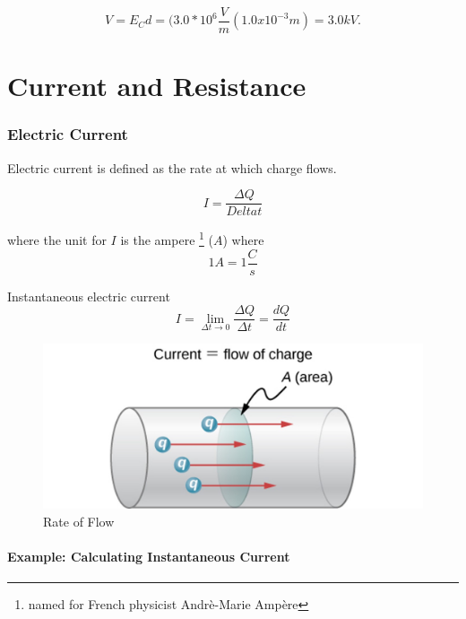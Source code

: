 \documentclass[14pt]{memoir}
\begin{document}
\begin{equation}
V = E_C d = (3.0 * 10^6 \frac{V}{m}(1.0 x 10^{-3}m) = 3.0 kV.
\end{equation}

\chapter{Current and Resistance}

\subsection{Electric Current}

Electric current is defined as the rate at which charge flows.

\begin{equation}
I = \frac{\Delta Q}{Delta t}
\end{equation}

where the unit for $I$ is the ampere \footnote{named for French physicist Andr\`e-Marie Amp\`ere} ($A$) where 
\begin{equation}
1 A = 1 \frac{C}{s}
\end{equation}

Instantaneous electric current
\begin{equation}
I = \lim_{\Delta t \rightarrow 0} \frac{\Delta Q}{\Delta t} = \frac{dQ}{dt}
\end{equation}


\begin{figure}[H]
\begin{center}
\includegraphics[scale=0.50]{fig/fig_09_02.jpg}
\caption{Rate of Flow}
\label{fig:09_02}
\end{center}
\end{figure}


\subsubsection{Example: Calculating Instantaneous Current}
\end{document}
